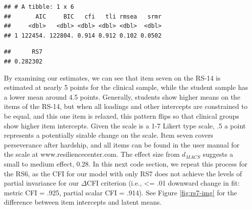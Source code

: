 \documentclass[
  man]{apa7}
\newenvironment{Shaded}{\begin{snugshade}}{\end{snugshade}}
\newcommand{\CommentTok}[1]{\textcolor[rgb]{0.56,0.35,0.01}{\textit{#1}}}
\newcommand{\DecValTok}[1]{\textcolor[rgb]{0.00,0.00,0.81}{#1}}
\newcommand{\FloatTok}[1]{\textcolor[rgb]{0.00,0.00,0.81}{#1}}
\newcommand{\FunctionTok}[1]{\textcolor[rgb]{0.13,0.29,0.53}{\textbf{#1}}}
\newcommand{\NormalTok}[1]{#1}
\newcommand{\SpecialCharTok}[1]{\textcolor[rgb]{0.81,0.36,0.00}{\textbf{#1}}}
\newcommand{\StringTok}[1]{\textcolor[rgb]{0.31,0.60,0.02}{#1}}
\begin{document}
\normalsize

\begin{verbatim}
## # A tibble: 1 x 6
##       AIC     BIC   cfi   tli rmsea   srmr
##     <dbl>   <dbl> <dbl> <dbl> <dbl>  <dbl>
## 1 122454. 122804. 0.914 0.912 0.102 0.0502
\end{verbatim}

\small

\begin{Shaded}
\end{Shaded}

\normalsize

\begin{verbatim}
##      RS7 
## 0.282302
\end{verbatim}

By examining our estimates, we can see that item seven on the RS-14 is estimated at nearly 5 points for the clinical sample, while the student sample has a lower mean around 4.5 points. Generally, students show higher means on the items of the RS-14, but when all loadings and other intercepts are constrained to be equal, and this one item is relaxed, this pattern flips so that clinical groups show higher item intercepts. Given the scale is a 1-7 Likert type scale, .5 a point represents a potentially sizable change on the scale. Item seven covers perseverance after hardship, and all items can be found in the user manual for the scale at www.resiliencecenter.com. The effect size from \(d_{MACS}\) suggests a small to medium effect, 0.28. In this next code section, we repeat this process for the RS6, as the CFI for our model with only RS7 does not achieve the levels of partial invariance for our \(\Delta\)CFI criterion (i.e., \textless= .01 downward change in fit: metric CFI = .925, partial scalar CFI = .914). See Figure \ref{fig:rs7-img} for the difference between item intercepts and latent means.

\small
\end{document}
